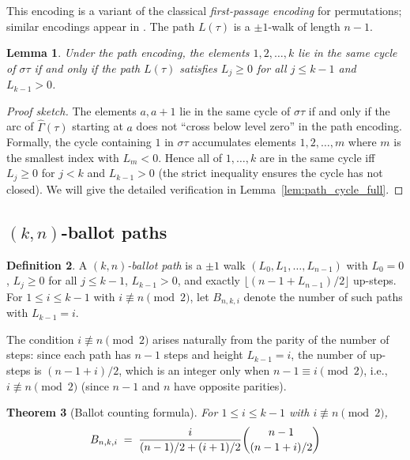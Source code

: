 \documentclass[12pt,a4paper]{article}
\newtheorem{theorem}{Theorem}[section]
\newtheorem{lemma}[theorem]{Lemma}
\theoremstyle{definition}
\newtheorem{definition}[theorem]{Definition}
\renewcommand{\binom}[2]{\dbinom{#1}{#2}}
\newcommand{\floor}[1]{\lfloor #1 \rfloor}
\begin{document}
This encoding is a variant of the classical \emph{first-passage encoding}
for permutations; similar encodings appear in \cite{FO1990}.  The path
$L(\tau)$ is a $\pm 1$-walk of length $n-1$.

\begin{lemma}
\label{lem:path_cycle}
Under the path encoding, the elements $1,2,\dots,k$ lie in the same
cycle of $\sigma\tau$ if and only if the path $L(\tau)$ satisfies
$L_j \ge 0$ for all $j \le k-1$ and $L_{k-1}>0$.
\end{lemma}

\begin{proof}[Proof sketch]
The elements $a,a+1$ lie in the same cycle of $\sigma\tau$ if and
only if the arc of $\widehat\Gamma(\tau)$ starting at $a$ does not
``cross below level zero'' in the path encoding.  Formally, the cycle
containing $1$ in $\sigma\tau$ accumulates elements $1,2,\dots,m$
where $m$ is the smallest index with $L_m < 0$.  Hence all of
$1,\dots,k$ are in the same cycle iff $L_j\ge 0$ for $j<k$ and
$L_{k-1}>0$ (the strict inequality ensures the cycle has not closed).
We will give the detailed verification in Lemma~\ref{lem:path_cycle_full}.
\end{proof}

\subsection{$(k,n)$-ballot paths}

\begin{definition}
\label{def:ballot_path}
A \emph{$(k,n)$-ballot path} is a $\pm 1$ walk $(L_0,L_1,\dots,L_{n-1})$
with $L_0=0$, $L_j\ge 0$ for all $j\le k-1$, $L_{k-1}>0$,
and exactly $\floor{(n-1+L_{n-1})/2}$ up-steps.
For $1\le i\le k-1$ with $i\not\equiv n\pmod 2$, let $B_{n,k,i}$ denote
the number of such paths with $L_{k-1}=i$.
\end{definition}

The condition $i\not\equiv n\pmod 2$ arises naturally from the parity
of the number of steps: since each path has $n-1$ steps and height
$L_{k-1}=i$, the number of up-steps is $(n-1+i)/2$, which is an
integer only when $n-1\equiv i\pmod{2}$, i.e., $i\not\equiv n\pmod{2}$
(since $n-1$ and $n$ have opposite parities).

\begin{theorem}[Ballot counting formula]
\label{thm:ballot}
For $1\le i\le k-1$ with $i\not\equiv n\pmod{2}$,
\[
B_{n,k,i}
\;=\;
\frac{i}{(n-1)/2+(i+1)/2}
\binom{n-1}{(n-1+i)/2}
\]
\end{theorem}
\end{document}
